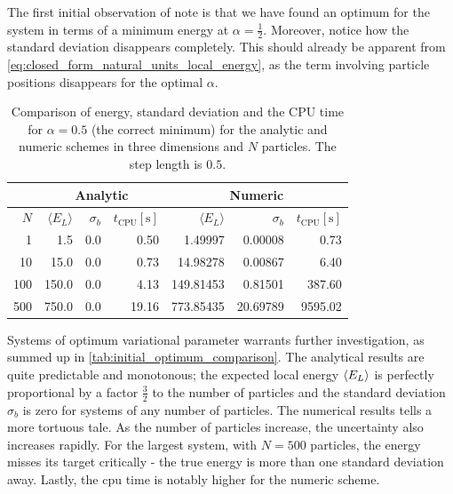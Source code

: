 \documentclass[
    a4paper, aps, twocolumn, floatfix, superscriptaddress, nofootinbib]{revtex4-1}
\newcommand{\1}{\mathds{1}}
\begin{document}
        The first initial observation of note is that we have found an optimum
        for the system in terms of a minimum energy at $\alpha=\frac{1}{2}$.
        Moreover, notice how the standard deviation disappears completely.  This
        should already be apparent from
        \autoref{eq:closed_form_natural_units_local_energy}, as the term
        involving particle positions disappears for the optimal $\alpha$.

        \begin{table}
            \caption{Comparison of energy, standard deviation and the CPU time
            for $\alpha = 0.5$ (the correct minimum) for the analytic and
            numeric schemes in three dimensions and $N$ particles. The step
            length is $0.5$.}
            \centering
            \begin{ruledtabular}
                \begin{tabular}{r|rrr|rrr}
                    & \multicolumn{3}{c|}{Analytic}
                    & \multicolumn{3}{c}{Numeric} \\
                    \hline
                    $N$
                    & $\langle E_L\rangle$ & $\sigma_b$
                    & $t_{\text{CPU}} [\si{\second}]$
                    & $\langle E_L\rangle$ & $\sigma_b$
                    & $t_{\text{CPU}} [\si{\second}]$ \\
                    \hline
                    1 & 1.5 & 0.0 & 0.50
                    & 1.49997 & 0.00008 & 0.73 \\
                    10 & 15.0 & 0.0 & 0.73
                    & 14.98278 & 0.00867 & 6.40 \\
                    100 & 150.0 & 0.0 & 4.13
                    & 149.81453 & 0.81501 & 387.60 \\
                    500 & 750.0 & 0.0 & 19.16
                    & 773.85435 & 20.69789 & 9595.02
                \end{tabular}
            \end{ruledtabular}
            \label{tab:initial_optimum_comparison}
        \end{table}


        Systems of optimum variational parameter warrants further investigation,
        as summed up in \autoref{tab:initial_optimum_comparison}. The analytical
        results are quite predictable and monotonous; the expected local energy
        $\expval{E_L}$ is perfectly proportional by a factor $\frac{3}{2}$ to
        the number of particles and the standard deviation $\sigma_b$ is zero
        for systems of any number of particles. The numerical results tells a
        more tortuous tale. As the number of particles increase, the uncertainty
        also increases rapidly. For the largest system, with $N = 500$
        particles, the energy misses its target critically - the true energy is
        more than one standard deviation away. Lastly, the cpu time is notably
        higher for the numeric scheme.
\end{document}
